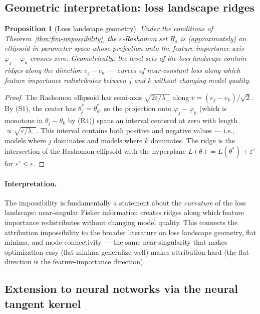 \documentclass{article}
\newtheorem{proposition}[theorem]{Proposition}
\begin{document}
\subsection{Geometric interpretation: loss landscape ridges}

\begin{proposition}[Loss landscape geometry]
\label{prop:geometry}
Under the conditions of Theorem~\ref{thm:fim-impossibility}, the
$\varepsilon$-Rashomon set $R_\varepsilon$ is (approximately) an
ellipsoid in parameter space whose projection onto the
feature-importance axis $\varphi_j - \varphi_k$ crosses zero.
Geometrically: the level sets of the loss landscape contain
\emph{ridges} along the direction $e_j - e_k$ --- curves of
near-constant loss along which feature importance redistributes
between $j$ and $k$ without changing model quality.
\end{proposition}

\begin{proof}
The Rashomon ellipsoid has semi-axis
$\sqrt{2\varepsilon/\lambda_-}$ along $v = (e_j - e_k)/\sqrt{2}$.
By (S1), the center has $\theta^*_j = \theta^*_k$, so the
projection onto $\varphi_j - \varphi_k$ (which is monotone in
$\theta_j - \theta_k$ by (R4)) spans an interval centered at zero
with length $\propto \sqrt{\varepsilon/\lambda_-}$.
This interval contains both positive and negative values ---
i.e., models where $j$ dominates and models where $k$ dominates.
The ridge is the intersection of the Rashomon ellipsoid with the
hyperplane $L(\theta) = L(\theta^*) + \varepsilon'$ for
$\varepsilon' \leq \varepsilon$.
\end{proof}

\paragraph{Interpretation.}
The impossibility is fundamentally a statement about the
\emph{curvature} of the loss landscape: near-singular Fisher
information creates ridges along which feature importance
redistributes without changing model quality.
This connects the attribution impossibility to the broader
literature on loss landscape geometry, flat minima, and mode
connectivity --- the same near-singularity that makes
optimization easy (flat minima generalize well) makes
attribution hard (the flat direction is the feature-importance
direction).

\subsection{Extension to neural networks via the neural tangent kernel}
\end{document}
